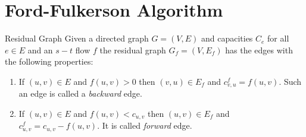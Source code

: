 \begin{Example}{}{}
\begin{center}
	\end{center}
\end{Example}


\section{Ford-Fulkerson Algorithm}
\begin{Definition}{Residual Graph}{}
	Given a directed graph $G=(V,E)$ and capacities $C_e$ for all $e\in E$ and an $s-t$ flow $f$ the residual graph $G_f=(V,E_f)$ has the edges with the following properties:
	\begin{enumerate}[label=\protect\circled{\arabic*}]
		\item If $(u,v)\in E$ and $f(u,v)>0$  then $(v,u)\in E_f$ and $c_{v,u}^f=f(u,v)$. Such an edge is called a \textit{backward} edge.
		\item If $(u,v)\in E$ and $f(u,v)<c_{u,v}$ then $(u,v)\in E_f$ and $c_{u,v}^f=c_{u,v}-f(u,v)$. It is called \textit{forward} edge.
	\end{enumerate}
\end{Definition}

